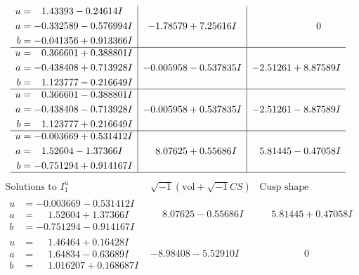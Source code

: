 \documentclass[1p]{elsarticle_modified}
\theoremstyle{definition}
\newcommand{\I}{\sqrt{-1}}
\begin{document}
$$\begin{array}{c|c|c}
\begin{aligned}
u &= \phantom{-}1.43393 - 0.24614 I \\
a &= -0.332589 - 0.576994 I \\
b &= -0.041356 + 0.913366 I\end{aligned}
 & -1.78579 + 7.25616 I & \phantom{-0.000000 } 0 \\ \hline\begin{aligned}
u &= \phantom{-}0.366601 + 0.388801 I \\
a &= -0.438408 + 0.713928 I \\
b &= \phantom{-}1.123777 - 0.216649 I\end{aligned}
 & -0.005958 - 0.537835 I & -2.51261 + 8.87589 I \\ \hline\begin{aligned}
u &= \phantom{-}0.366601 - 0.388801 I \\
a &= -0.438408 - 0.713928 I \\
b &= \phantom{-}1.123777 + 0.216649 I\end{aligned}
 & -0.005958 + 0.537835 I & -2.51261 - 8.87589 I \\ \hline\begin{aligned}
u &= -0.003669 + 0.531412 I \\
a &= \phantom{-}1.52604 - 1.37366 I \\
b &= -0.751294 + 0.914167 I\end{aligned}
 & \phantom{-}8.07625 + 0.55686 I & \phantom{-}5.81445 - 0.47058 I\\
 \hline 
 \end{array}$$\newpage$$\begin{array}{c|c|c}  
\text{Solutions to }I^u_{1}& \I (\text{vol} + \sqrt{-1}CS) & \text{Cusp shape}\\
 \hline 
\begin{aligned}
u &= -0.003669 - 0.531412 I \\
a &= \phantom{-}1.52604 + 1.37366 I \\
b &= -0.751294 - 0.914167 I\end{aligned}
 & \phantom{-}8.07625 - 0.55686 I & \phantom{-}5.81445 + 0.47058 I \\ \hline\begin{aligned}
u &= \phantom{-}1.46464 + 0.16428 I \\
a &= \phantom{-}1.64834 - 0.63689 I \\
b &= \phantom{-}1.016207 + 0.168687 I\end{aligned}
 & -8.98408 - 5.52910 I & \phantom{-0.000000 } 0 \\ \hline\begin{aligned}

\end{aligned}
\end{array}$$
\end{document}
